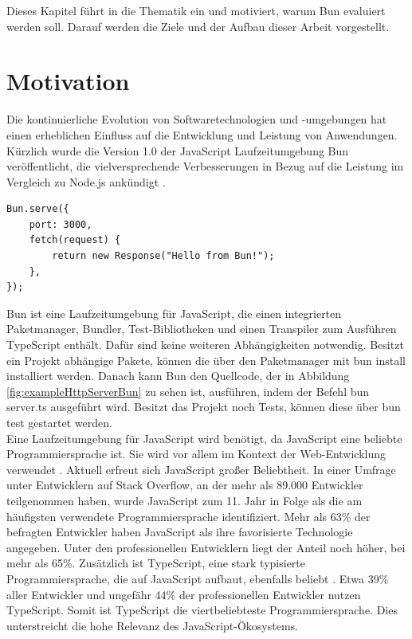 \pagestyle{fancy-style}
 \label{ch:introduction}
Dieses Kapitel führt in die Thematik ein und motiviert, warum Bun evaluiert werden soll. Darauf werden die Ziele und der Aufbau dieser Arbeit vorgestellt.

\section{Motivation} \label{sec:introduction-motivation}
Die kontinuierliche Evolution von Softwaretechnologien und -umgebungen hat einen erheblichen Einfluss auf die Entwicklung und Leistung von Anwendungen. Kürzlich wurde die Version 1.0 der JavaScript Laufzeitumgebung Bun veröffentlicht, die vielversprechende Verbesserungen in Bezug auf die Leistung im Vergleich zu Node.js ankündigt \cite{Sumner.2023c}.\\

\begin{lstlisting}[label={fig:exampleHttpServerBun},caption={[HTTP-Server Bun]HTTP-Server Bun \cite{Sumner.2023c}}]
Bun.serve({
	port: 3000,
	fetch(request) {
		return new Response("Hello from Bun!");
	},
});
\end{lstlisting}

\noindent
Bun ist eine Laufzeitumgebung für JavaScript, die einen integrierten Paketmanager, Bundler, Test-Bibliotheken und einen Transpiler zum Ausführen TypeScript enthält. Dafür sind keine weiteren Abhängigkeiten notwendig. Besitzt ein Projekt abhängige Pakete, können die über den Paketmanager mit \glqq bun install\grqq{} installiert werden. Danach kann Bun den Quellcode, der in Abbildung \ref{fig:exampleHttpServerBun} zu sehen ist, ausführen, indem der Befehl \glqq bun server.ts\grqq{} ausgeführt wird. Besitzt das Projekt noch Tests, können diese über \glqq bun test\grqq{} gestartet werden.\\

\noindent
Eine Laufzeitumgebung für JavaScript wird benötigt, da JavaScript eine beliebte Programmiersprache ist. Sie wird vor allem im Kontext der Web-Entwicklung verwendet \cite{Brown.November2019}. Aktuell erfreut sich JavaScript großer Beliebtheit. In einer Umfrage unter Entwicklern auf Stack Overflow, an der mehr als 89.000 Entwickler teilgenommen haben, wurde JavaScript zum 11. Jahr in Folge als die am häufigsten verwendete Programmiersprache identifiziert. Mehr als 63\% der befragten Entwickler haben JavaScript als ihre favorisierte Technologie angegeben. Unter den professionellen Entwicklern liegt der Anteil noch höher, bei mehr als 65\%. Zusätzlich ist TypeScript, eine stark typisierte Programmiersprache, die auf 
JavaScript aufbaut, ebenfalls beliebt \cite{Microsoft.o.J.}. Etwa 39\% aller Entwickler und ungefähr 44\% der professionellen Entwickler nutzen TypeScript. Somit ist TypeScript die viertbeliebteste Programmiersprache. Dies unterstreicht die hohe Relevanz des JavaScript-Ökosystems.\cite{StackOverflow.2023}\\

